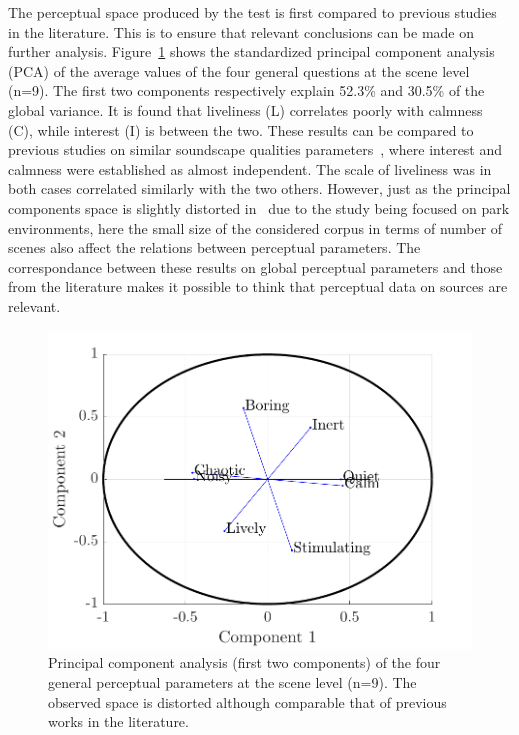 \documentclass{article}
\begin{document}
\begin{sloppy}
The perceptual space produced by the test is first compared to previous studies in the literature. This is to ensure that relevant conclusions can be made on further analysis. Figure~\ref{fig:pca} shows the standardized principal component analysis (PCA) of the average values of the four general questions at the scene level (n=9). The first two components respectively explain 52.3\% and 30.5\% of the global variance. It is found that liveliness (L) correlates poorly with calmness (C), while interest (I) is between the two. These results can be compared to previous studies on similar soundscape qualities parameters~\cite{axelsson2010, cain2013, jeon2018}, where interest and calmness were established as almost independent. The scale of liveliness was in both cases correlated similarly with the two others. However, just as the principal components space is slightly distorted in~\cite{jeon2018} due to the study being focused on park environments, here the small size of the considered corpus in terms of number of scenes also affect the relations between perceptual parameters. The correspondance between these results on global perceptual parameters and those from the literature makes it possible to think that perceptual data on sources are relevant.

\begin{figure}[t]
  \centering
  \centerline{\includegraphics[width=0.8\columnwidth]{pca.pdf}}
  \caption{Principal component analysis (first two components) of the four general perceptual parameters at the scene level (n=9). The observed space is distorted although comparable that of previous works in the literature.}
  \label{fig:pca}
\end{figure}


\end{sloppy}
\end{document}
